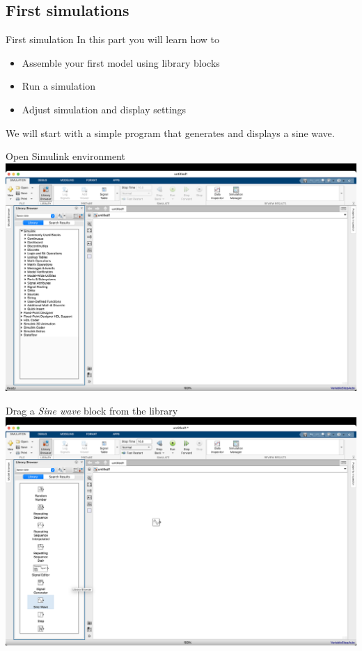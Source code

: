\subsection{First simulations}
\begin{frame}{First simulation}
In this part you will learn how to
    \begin{itemize}
        \item Assemble your first model using library blocks
        \item Run a simulation
        \item Adjust simulation and display settings
    \end{itemize}
\vfill
\pause
We will start with a simple program that generates and displays a sine wave.  
\end{frame}
\begin{frame}{Open Simulink environment}
    \hspace*{-11mm}
    \includegraphics[width=\paperwidth]{lesson_2/images/simulink_screen_01.png}
\end{frame}

\begin{frame}{Drag a \textit{Sine wave} block from the library}
    \hspace*{-11mm}
    \includegraphics[width=\paperwidth]{lesson_2/images/simulink_screen_02.png}
\end{frame}
  
